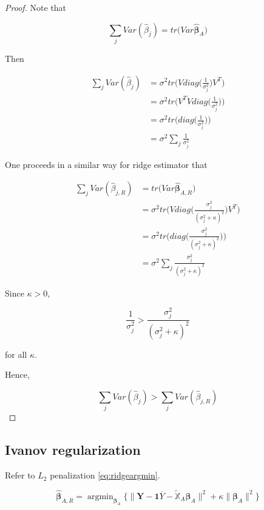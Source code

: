 \documentclass[]{book}
\DeclareMathOperator*{\argmin}{argmin}
\theoremstyle{definition}
\theoremstyle{definition}
\theoremstyle{definition}
\theoremstyle{remark}
\let\BeginKnitrBlock\begin \let\EndKnitrBlock\end
\begin{document}
\BeginKnitrBlock{proof}
{}Note that

\[\sum_j Var(\hat\beta_j) = tr\Big(Var\boldsymbol{\hat\beta}_{A} \Big)\]

Then

\begin{equation}
  \begin{split}
    \sum_j Var(\hat\beta_j) & = \sigma^2 tr \bigg( V diag\bigg( \frac{1}{\sigma_j^2} \bigg) V^T \bigg) \\
    & = \sigma^2 tr \bigg( V^T V diag\bigg( \frac{1}{\sigma_j^2} \bigg) \bigg) \\
    & = \sigma^2 tr \bigg( diag\bigg( \frac{1}{\sigma_j^2} \bigg) \bigg) \\
    & = \sigma^2 \sum_j \frac{1}{\sigma_j^2}
  \end{split}
\end{equation}

One proceeds in a similar way for ridge estimator that

\begin{equation}
  \begin{split}
    \sum_j Var(\hat\beta_{j, R}) & = tr\Big( Var\boldsymbol{\hat\beta}_{A, R} \Big) \\
    & = \sigma^2 tr \bigg( V diag\bigg( \frac{\sigma_j^2}{(\sigma_j^2 + \kappa)^2} \bigg) V^T \bigg) \\
    & = \sigma^2 tr \bigg( diag\bigg( \frac{\sigma_j^2}{(\sigma_j^2 + \kappa)^2} \bigg) \bigg) \\
    & = \sigma^2 \sum_j \frac{\sigma_j^2}{(\sigma_j^2 + \kappa)^2}
  \end{split}
\end{equation}

Since \(\kappa > 0\),

\[\frac{1}{\sigma_j^2} > \frac{\sigma_j^2}{(\sigma_j^2 + \kappa)^2}\]

for all \(\kappa\).

Hence,

\[\sum_j Var(\hat\beta_j) > \sum_j Var(\hat\beta_{j, R})\]
\EndKnitrBlock{proof}

\hypertarget{ivanov-regularization}{%
\subsection{Ivanov regularization}\label{ivanov-regularization}}

Refer to \(L_2\) penalization \eqref{eq:ridgeargmin}.

\begin{equation}
  \boldsymbol{\hat\beta}_{A, R} = \argmin_{\boldsymbol\beta_A} \bigg\{ \lVert \mathbf{Y} - \mathbf{1} \overline{Y} - \widetilde{\mathbb{X}}_A \boldsymbol\beta_A \rVert^2 + \kappa \lVert \boldsymbol\beta_A \rVert^2 \bigg\}
  \label{eq:ridgetikhonov}
\end{equation}
\end{document}
